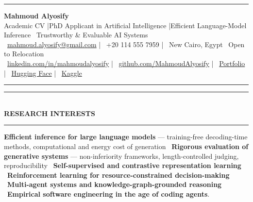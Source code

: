 \documentclass[10pt, a4paper]{article}
\newcommand{\faEnvelope}{}\newcommand{\faPhone}{}\newcommand{\faMapMarker}{}%
\newcommand{\faLinkedin}{}\newcommand{\faGithub}{}\newcommand{\faRobot}{}%
\newcommand{\faChartBar}{}\newcommand{\faGlobe}{}%
\newcommand{\cvsection}[1]{%
  \vspace{3pt}%
  {\color{navy}\rule{\linewidth}{1.1pt}}\\[0.5pt]%
  {\color{navy}\bfseries\fontsize{9.5}{11}\selectfont\uppercase{#1}}\\[-4pt]%
  {\color{teal}\rule{\linewidth}{0.6pt}}%
  \vspace{2pt}%
}
\begin{document}
\small

{\color{navy}\rule{\linewidth}{1.5pt}}

\vspace{3pt}
\begin{center}
  {\fontsize{21}{24}\bfseries\color{navy} Mahmoud Alyosify}\\[3pt]
  {\fontsize{10}{12}\color{teal}
    Academic CV \enspace|\enspace PhD Applicant in Artificial Intelligence
    \enspace|\enspace Efficient Language-Model Inference \textperiodcentered\ Trustworthy \& Evaluable AI Systems
}\\[4pt]
  {\color{midgray}
    \faEnvelope\ \href{mailto:mahmoud.alyosify@gmail.com}{mahmoud.alyosify@gmail.com}
    \enspace|\enspace
    \faPhone\ +20 114 555 7959
    \enspace|\enspace
    \faMapMarker\ New Cairo, Egypt \textperiodcentered\ Open to Relocation}\\[2pt]
  {\faLinkedin\ \href{https://linkedin.com/in/mahmoudalyosify}{linkedin.com/in/mahmoudalyosify}
    \enspace|\enspace
    \faGithub\ \href{https://github.com/MahmoudAlyosify}{github.com/MahmoudAlyosify}
    \enspace|\enspace
    \faGlobe\ \href{https://mahmoudalyosifysite.github.io/}{Portfolio}
    \enspace|\enspace
    \faRobot\ \href{https://huggingface.co/mahmoudalyosify}{Hugging Face}
    \enspace|\enspace
    \faChartBar\ \href{https://kaggle.com/mahmoudalyosify}{Kaggle}}
\end{center}

{\color{navy}\rule{\linewidth}{1.5pt}}

\vspace{2pt}

\cvsection{Research Interests}

{\color{darkgray}\justifying
\textbf{Efficient inference for large language models} --- training-free decoding-time methods, computational and energy cost of generation \textperiodcentered\ \textbf{Rigorous evaluation of generative systems} --- non-inferiority frameworks, length-controlled judging, reproducibility \textperiodcentered\ \textbf{Self-supervised and contrastive representation learning} \textperiodcentered\ \textbf{Reinforcement learning for resource-constrained decision-making} \textperiodcentered\ \textbf{Multi-agent systems and knowledge-graph-grounded reasoning} \textperiodcentered\ \textbf{Empirical software engineering in the age of coding agents}.}
\end{document}
